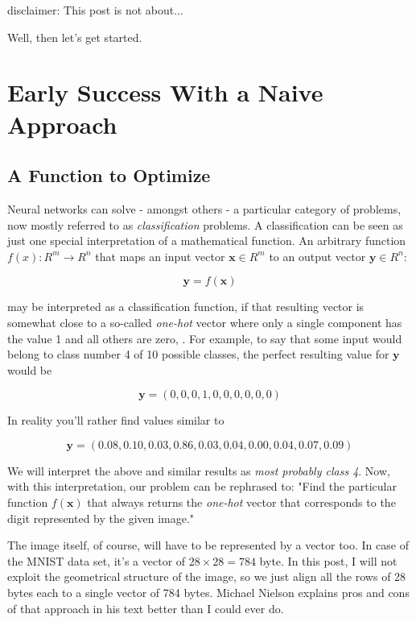 \documentclass[]{report}
\begin{document}
\bigskip 

disclaimer: This post is not about...

Well, then let's get started.
 
 \part{Early Success With a Naive Approach}
 
 \chapter{A Function to Optimize}
 

Neural networks can solve - amongst others - a particular category of problems, now mostly referred to as \emph{classification} problems. A classification can be seen as just one special interpretation of a mathematical function. An arbitrary function \(f(x): R^m \rightarrow R^n\) that maps an input vector \(\mathbf{x} \in R^m\) to an output vector \(\mathbf{y} \in R^n\):

\begin{equation}
	\mathbf{y}=f(\mathbf{x})
\end{equation}

may be interpreted as a classification function, if that resulting vector is somewhat close to a so-called \emph{one-hot} vector where only a single component has the value 1 and all others are zero, . For example, to say that some input would belong to class number 4 of 10 possible classes, the perfect resulting value for \(\mathbf{y}\) would be

\begin{equation}
\mathbf{y} = (0,0,0,1,0,0,0,0,0,0)
\end{equation}

In reality you'll rather find values similar to

\begin{equation}
\mathbf{y} = (0.08, 0.10, 0.03, 0.86, 0.03, 0.04, 0.00, 0.04, 0.07, 0.09)
\end{equation}

We will interpret the above and similar results as \emph{most probably class 4}. Now, with this interpretation, our problem can be rephrased to: "Find the particular function \(f(\mathbf{x})\) that always returns the \emph{one-hot} vector that corresponds to the digit represented by the given image."

The image itself, of course, will have to be represented by a vector too. In case of the MNIST data set, it's a vector of \(28 \times 28 = 784\) byte. In this post, I will not exploit the geometrical structure of the image, so we just align all the rows of 28 bytes each to a single vector of 784 bytes. Michael Nielson explains pros and cons of that approach in his text better than I could ever do.
\end{document}

